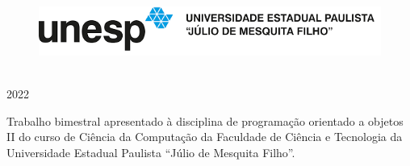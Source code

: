\thispagestyle{empty}
\begin{figure}[h]
    \includegraphics[scale=0.65]{images/unesp.png}
    \centering
\end{figure}


\vspace{1cm}

\begin{center}
    \nome
\end{center}

\vspace{3cm}

\begin{center}
    \titulo
\end{center}

\vspace*{\fill}

\begin{center}
    \uppercase{\cidade\\2022}
\end{center}


\newpage

\thispagestyle{empty}

\begin{center}
    \nome
\end{center}

\vspace{5cm}

\begin{center}
    \titulo
\end{center}

\vspace{5cm}

\begin{natureza}
    \noindent Trabalho bimestral apresentado à disciplina de programação orientado a objetos II do curso de Ciência da Computação da Faculdade de Ciência e Tecnologia da Universidade Estadual Paulista ``Júlio de Mesquita Filho''.\\
    \orientador
\end{natureza}

